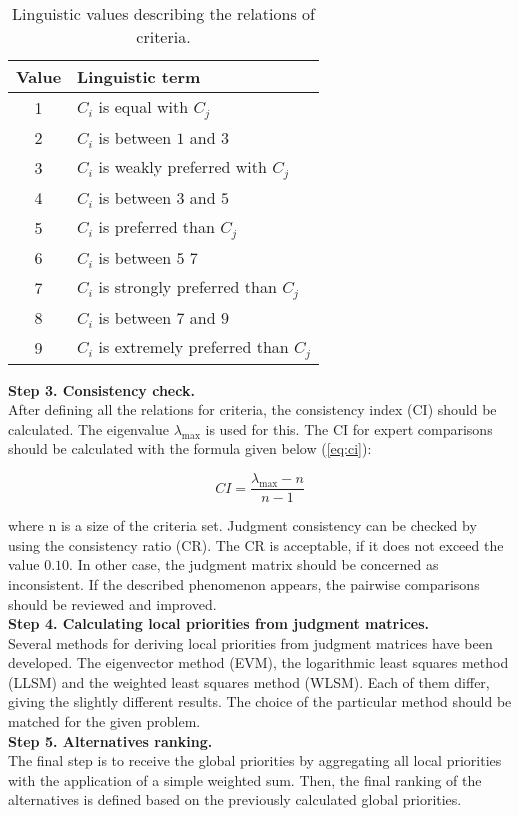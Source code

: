 \begin{table}[h!]
    \centering
    \begin{tabular}{cl}
    \hline
        Value & Linguistic term \\ \hline
        1 & $C_{i}$ is equal with $C_{j}$ \\
        2 & $C_{i}$ is between $1$ and $3$\\
        3 & $C_{i}$ is weakly preferred with $C_{j}$\\
        4 & $C_{i}$ is between $3$ and $5$\\
        5 & $C_{i}$ is preferred than $C_{j}$\\
        6 & $C_{i}$ is between $5$ $7$\\
        7 & $C_{i}$ is strongly preferred than $C_{j}$\\
        8 & $C_{i}$ is between $7$ and $9$\\
        9 & $C_{i}$ is extremely preferred than $C_{j}$\\ \hline
    \end{tabular}
    \caption{Linguistic values describing the relations of criteria.}
    \label{tab:lv}
\end{table}

\noindent \textbf{Step 3. Consistency check.} \\

After defining all the relations for criteria, the consistency index (CI) should be calculated. The eigenvalue $\lambda_{\max}$ is used for this. The CI for expert comparisons should be calculated with the formula given below (\ref{eq:ci}):

\begin{equation}
C I=\frac{\lambda_{\max }-n}{n-1}
\label{eq:ci}
\end{equation}

where n is a size of the criteria set. Judgment consistency can be checked by using the consistency ratio (CR). The CR is acceptable, if it does not exceed the value $0.10$. In other case, the judgment matrix should be concerned as inconsistent. If the described phenomenon appears, the pairwise comparisons should be reviewed and improved. \\

\noindent \textbf{Step 4. Calculating local priorities from judgment matrices.} \\

Several methods for deriving local priorities from judgment matrices have been developed. The eigenvector method (EVM), the logarithmic least squares method (LLSM) and the weighted least squares method (WLSM). Each of them differ, giving the slightly different results. The choice of the particular method should be matched for the given problem. \\

\noindent \textbf{Step 5. Alternatives ranking.} \\

The final step is to receive the global priorities by aggregating all local priorities with the application of a simple weighted sum. Then, the final ranking of the alternatives is defined based on the previously calculated global priorities. \\